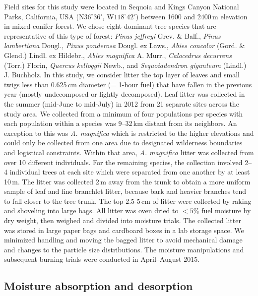 \documentclass[letterpaper,12pt]{article}
\begin{document}
Field sites for this study were located in Sequoia and Kings Canyon National
Parks, California, USA (N$36^\circ 36'$, W$118^\circ 42'$) between 1600 and
2400\,m elevation in mixed-conifer forest. We chose eight dominant tree species
that are representative of this type of forest: \emph{Pinus jeffreyi} Grev. \&
Balf., \emph{Pinus lambertiana} Dougl., \emph{Pinus ponderosa} Dougl. ex Laws.,
\emph{Abies concolor} (Gord. \& Glend.) Lindl. ex Hildebr., \emph{Abies
  magnifica} A. Murr., \emph{Calocedrus decurrens} (Torr.) Florin,
\emph{Quercus kelloggii} Newb., and \emph{Sequoiadendron giganteum} (Lindl.) J.
Buchholz. In this study, we consider litter the top layer of leaves and small
twigs less than 0.625\,cm diameter (= 1-hour fuel) that have fallen in the
previous year (mostly undecomposed or lightly decomposed). Leaf litter was
collected in the summer (mid-June to mid-July) in 2012 from 21 separate sites
across the study area. We collected from a minimum of four populations per
species with each population within a species was 9--32\,km distant from its
neighbors. An exception to this was \emph{A. magnifica} which is restricted to
the higher elevations and could only be collected from one area due to
designated wilderness boundaries and logistical constraints. Within that area,
\emph{A. magnifica} litter was collected from over 10 different individuals.
For the remaining species, the collection involved 2--4 individual trees at
each site which were separated from one another by at least 10\,m. The litter
was collected 2\,m away from the trunk to obtain a more uniform sample of leaf
and fine branchlet litter, because bark and heavier branches tend to fall
closer to the tree trunk. The top 2.5-5\,cm of litter were collected by raking
and shoveling into large bags. All litter was oven dried to $< 5$\% fuel
moisture by dry weight, then weighed and divided into moisture trials. The
collected litter was stored in large paper bags and cardboard boxes in a lab
storage space. We minimized handling and moving the bagged litter to avoid
mechanical damage and changes to the particle size distributions. The moisture
manipulations and subsequent burning trials were conducted in April--August
2015.

\subsection*{Moisture absorption and desorption}
\end{document}
